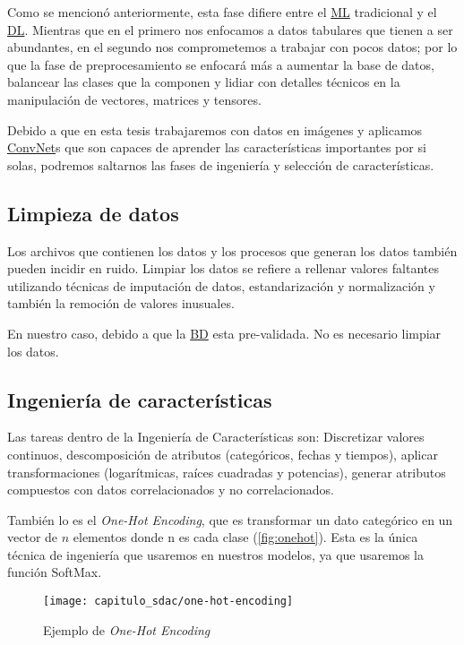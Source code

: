 Como se mencionó anteriormente, esta fase difiere entre el \hyperlink{abbr}{ML}
tradicional y el \hyperlink{abbr}{DL}. Mientras que en el primero nos enfocamos
a datos tabulares que tienen a ser abundantes, en el segundo nos comprometemos a
trabajar con pocos datos; por lo que la fase de preprocesamiento se enfocará más
a aumentar la base de datos, balancear las clases que la componen y lidiar con
detalles técnicos en la manipulación de vectores, matrices y tensores.

Debido a que en esta tesis trabajaremos con datos en imágenes y aplicamos
\hyperlink{abbr}{ConvNet}s que son capaces de aprender las características
importantes por si solas, podremos saltarnos las fases de ingeniería y selección
de características.

\subsection{Limpieza de datos}

Los archivos que contienen los datos y los procesos que generan los datos
también pueden incidir en ruido. Limpiar los datos se refiere a rellenar valores
faltantes utilizando técnicas de imputación de datos, estandarización y
normalización y también la remoción de valores inusuales.

En nuestro caso, debido a que la \hyperlink{abbr}{BD} esta pre-validada. No es
necesario limpiar los datos.

\subsection{Ingeniería de características}

Las tareas dentro de la Ingeniería de Características son: Discretizar valores
continuos, descomposición de atributos (categóricos, fechas y tiempos), aplicar
transformaciones (logarítmicas, raíces cuadradas y potencias), generar
atributos compuestos con datos correlacionados y no correlacionados.

También lo es el \emph{One-Hot Encoding}, que es transformar un dato categórico
en un vector de \( n \) elementos donde n es cada clase (\autoref{fig:onehot}).
Esta es la única técnica de ingeniería que usaremos en nuestros modelos, ya que
usaremos la función SoftMax.

\begin{figure}[H]
    \centering
    \texttt{[image: capitulo\_sdac/one-hot-encoding]}
    \caption{Ejemplo de \emph{One-Hot Encoding}}\label{fig:onehot}
\end{figure}

